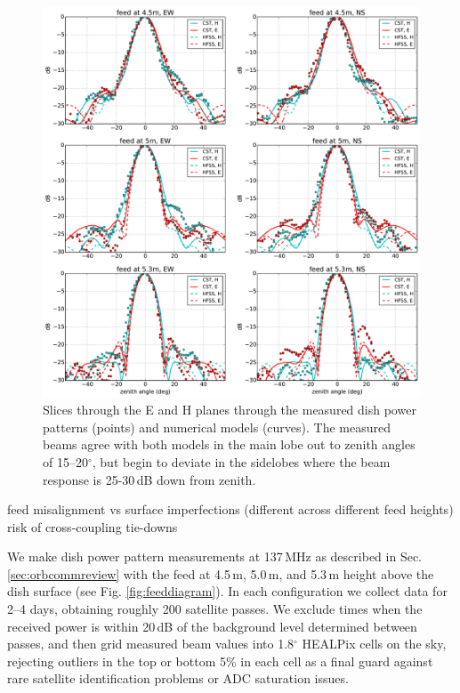 \documentclass{emulateapj}
\begin{document}
\begin{figure}[t]
\centering
\includegraphics[width=6.5in]{measured_beams_and_models_slices.pdf}
\caption{Slices through the E and H planes through the measured dish power patterns (points) and numerical models (curves). The measured beams agree with both models in the main lobe out to zenith angles of 15--20$^\circ$, but begin to deviate in the sidelobes where the beam response is 25-30\,dB down from zenith.}
\label{fig:measuredbeamslices}
\end{figure}

feed misalignment vs surface imperfections (different across different feed heights)
risk of cross-coupling
tie-downs

We make dish power pattern measurements at 137\,MHz as described in Sec. \ref{sec:orbcommreview} with the feed at 4.5\,m, 5.0\,m, and 5.3\,m height above the dish surface (see Fig. \ref{fig:feeddiagram}). In each configuration we collect data for 2--4 days, obtaining roughly 200 satellite passes. We exclude times when the received power is within 20\,dB of the background level determined between passes, and then grid measured beam values into 1.8$^\circ$ HEALPix cells on the sky, rejecting outliers in the top or bottom 5\% in each cell as a final guard against rare satellite identification problems or ADC saturation issues.
\end{document}
